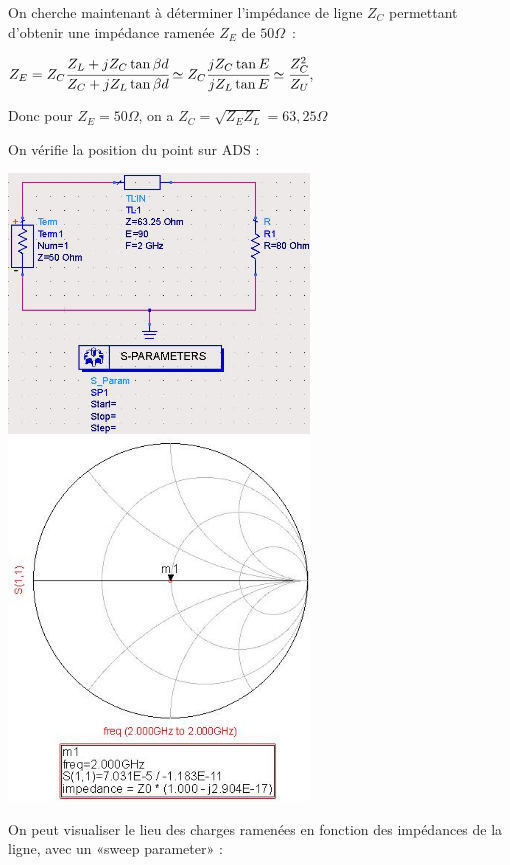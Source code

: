 \documentclass[10pt]{article}
\begin{document}
   \newpage
   On cherche maintenant à déterminer l’impédance de ligne $Z_C$ permettant d’obtenir une impédance ramenée $Z_E$ de $50 \Omega$ :
   
   $Z_E = Z_C \cfrac{Z_L +j Z_C\tan{\beta d}}{Z_C + j Z_L \tan{\beta d}} \simeq Z_C \cfrac{j Z_C \tan{E}}{j Z_L \tan{E}} \simeq \cfrac{Z_C^2}{Z_U}$, 

   Donc pour $Z_E=50 \Omega$, on a $Z_C=\sqrt{Z_E Z_L} = 63,25 \Omega$

   On vérifie la position du point sur ADS :

   \includegraphics[width=8cm]{I2_e_50-circuit.jpg}
   \includegraphics[width=8cm]{I2_e_50-simulation.jpg}

   On peut visualiser le lieu des charges ramenées en fonction des impédances de la ligne, avec un «sweep parameter» :
\end{document}
